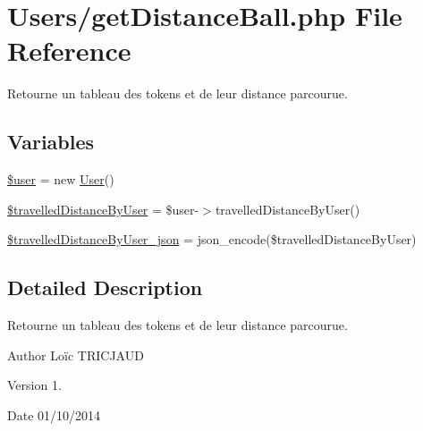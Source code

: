 \hypertarget{get_distance_ball_8php}{\section{Users/get\-Distance\-Ball.php File Reference}
\label{get_distance_ball_8php}
}


Retourne un tableau des tokens et de leur distance parcourue.  


\subsection*{Variables}
\begin{DoxyCompactItemize}
\item 
\hyperlink{get_distance_ball_8php_a598ca4e71b15a1313ec95f0df1027ca5}{\$user} = new \hyperlink{class_user}{User}()
\item 
\hyperlink{get_distance_ball_8php_af07725a1ea14706f2eb9d5a7fc5e73a1}{\$travelled\-Distance\-By\-User} = \$user-\/$>$travelled\-Distance\-By\-User()
\item 
\hyperlink{get_distance_ball_8php_a3983344d142c90a7a131a7128a99d283}{\$travelled\-Distance\-By\-User\-\_\-json} = json\-\_\-encode(\$travelled\-Distance\-By\-User)
\end{DoxyCompactItemize}


\subsection{Detailed Description}
Retourne un tableau des tokens et de leur distance parcourue. \begin{DoxyAuthor}{Author}
Loïc T\-R\-I\-C\-J\-A\-U\-D 
\end{DoxyAuthor}
\begin{DoxyVersion}{Version}
1. 
\end{DoxyVersion}
\begin{DoxyDate}{Date}
01/10/2014 
\end{DoxyDate}


